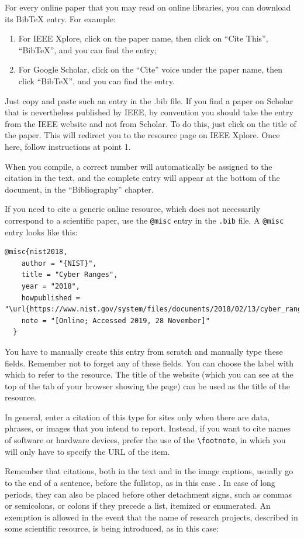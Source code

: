 For every online paper that you may read on online libraries, you can download its BibTeX entry. For example:
\begin{enumerate}
	\item For IEEE Xplore, click on the paper name, then click on ``Cite This'', ``BibTeX'', and you can find the entry;
	\item For Google Scholar, click on the ``Cite'' voice under the paper name, then click ``BibTeX'', and you can find the entry.
\end{enumerate}

Just copy and paste such an entry in the .bib file. If you find a paper on Scholar that is nevertheless published by IEEE, by convention you should take the entry from the IEEE website and not from Scholar. To do this, just click on the title of the paper. This will redirect you to the resource page on IEEE Xplore. Once here, follow instructions at point 1.

When you compile, a correct number will automatically be assigned to the citation in the text, and the complete entry will appear at the bottom of the document, in the ``Bibliography'' chapter.

If you need to cite a generic online resource, which does not necessarily correspond to a scientific paper, use the \lstinline{@misc} entry in the \texttt{.bib} file. A \lstinline{@misc} entry looks like this:

\begin{verbatim}
@misc{nist2018,
    author = "{NIST}",
    title = "Cyber Ranges",
    year = "2018",
    howpublished = "\url{https://www.nist.gov/system/files/documents/2018/02/13/cyber_ranges.pdf}",
    note = "[Online; Accessed 2019, 28 November]"
  }
\end{verbatim}

You have to manually create this entry from scratch and manually type these fields. Remember not to forget any of these fields. You can choose the label with which to refer to the resource. The title of the website (which you can see at the top of the tab of your browser showing the page) can be used as the title of the resource.

In general, enter a citation of this type for sites only when there are data, phrases, or images that you intend to report. Instead, if you want to cite names of software or hardware devices, prefer the use of the \lstinline{\footnote}, in which you will only have to specify the URL of the item.

Remember that citations, both in the text and in the image captions, usually go to the end of a sentence, before the fullstop, as in this case \cite{vykopal2017kypo}. In case of long periods, they can also be placed before other detachment signs, such as commas or semicolons, or colons if they precede a list, itemized or enumerated. An exemption is allowed in the event that the name of research projects, described in some scientific resource, is being introduced, as in this case:

